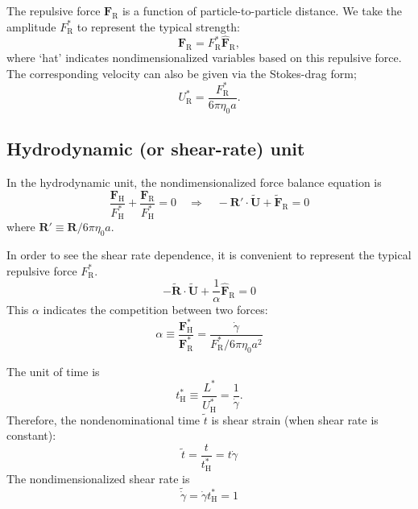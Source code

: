 \documentclass[fontsize=11pt]{scrartcl}
\begin{document}
The repulsive force $\bm{F}_{\mathrm{R}}$ 
is a function of particle-to-particle distance.
%
We take the amplitude $F_{\mathrm{R}}^{\ast}$
to represent the typical strength:
%
\begin{equation}
 \bm{F}_{\mathrm{R}} =  F_{\mathrm{R}}^{\ast}
\hat{\bm{F}}_{\mathrm{R}},
\end{equation}
where `hat' indicates nondimensionalized variables
based on this repulsive force.
%
The corresponding velocity can also be
given via the Stokes-drag form;
\begin{equation}
 U^{\ast}_{\mathrm{R}}
  = \frac{F_{\mathrm{R}}^{\ast}}{6\pi\eta_0 a}.
\end{equation}
%

\subsection*{Hydrodynamic (or shear-rate) unit}

In the hydrodynamic unit, the nondimensionalized
force balance equation is
\begin{equation}
 \frac{\bm{F}_{\mathrm{H}}}{F^{\ast}_{\mathrm{H}}}
  +
  \frac{\bm{F}_{\mathrm{R}}}{F^{\ast}_{\mathrm{H}}}  = 0
  \quad
  \Longrightarrow 
    \quad
 - \bm{R}' \cdot \tilde{\bm{U}} + \tilde{\bm{F}}_{\mathrm{R}} = 0
\end{equation}
where
$\bm{R}' \equiv \bm{R} / 6 \pi \eta_0 a $.

In order to see the shear rate dependence,
it is convenient to represent
the typical repulsive force $F_{\mathrm{R}}^{\ast}$.
%
\begin{equation}
 - \tilde{\bm{R}} \cdot \tilde{\bm{U}} +
\frac{1}{\alpha}  \hat{\bm{F}}_{\mathrm{R}} = 0
\end{equation}
%
This $\alpha$ indicates the competition between two forces:
\begin{equation}
 \alpha \equiv
\frac{\bm{F}_{\mathrm{H}}^{\ast}}{\bm{F}_{\mathrm{R}}^{\ast}}
=
  \frac{\dot{\gamma}}{F_{\mathrm{R}}^{\ast}/6\pi\eta_0 a^2}\label{102734_31May15}
\end{equation}


The unit of time is
\begin{equation}
 t_{\mathrm{H}}^{\ast} \equiv \frac{L^{\ast}}{U_{\mathrm{H}}^{\ast}}
  = \frac{1}{\dot{\gamma}}.
\end{equation}
Therefore, the nondenominational time $\tilde{t}$
is shear strain (when shear rate is constant):
\begin{equation} 
 \tilde{t} = \frac{t}{t_{\mathrm{H}}^{\ast}} = t \dot{\gamma}
\end{equation}
%
The nondimensionalized shear rate is
\begin{equation}
 \tilde{\dot{\gamma}}
  =
  \dot{\gamma} t_{\mathrm{H}}^{\ast} = 1
\end{equation}
\end{document}
